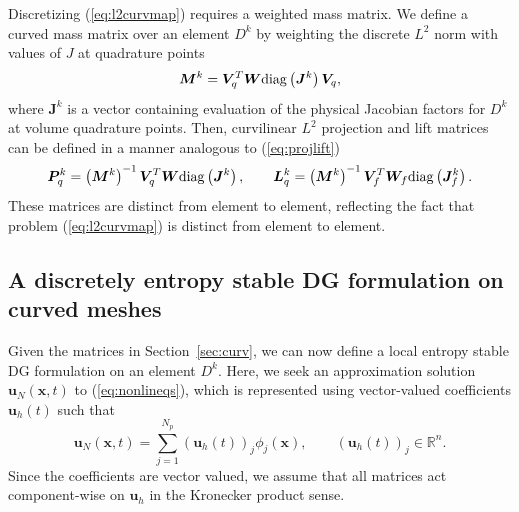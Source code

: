 \documentclass[preprint,10pt]{article}
\theoremstyle{definition}
\theoremstyle{lemma}
\theoremstyle{theorem}
\theoremstyle{assumption}
\newcommand{\LRp}[1]{\left( #1 \right)}
\newcommand{\diag}[1]{{\rm diag}\LRp{#1}}
\begin{document}
{Discretizing (\ref{eq:l2curvmap}) requires a weighted mass matrix.  We define a curved mass matrix over an element $D^k$ by weighting the discrete $L^2$ norm with values of $J$ at quadrature points
\begin{equation}
\bm{M}^k = \bm{V}_q^T \bm{W}\diag{\bm{J}^k}\bm{V}_q,
\label{eq:curvedmass}
\end{equation}
where $\bm{J}^k$ is a vector containing evaluation of the physical Jacobian factors for $D^k$ at volume quadrature points.
Then, curvilinear $L^2$ projection and lift matrices can be defined in a manner analogous to (\ref{eq:projlift})
\begin{equation}
\bm{P}^k_q = \LRp{\bm{M}^k}^{-1}\bm{V}_q^T\bm{W}\diag{\bm{J}^k}, \qquad \bm{L}^k_q = \LRp{\bm{M}^k}^{-1}\bm{V}_f^T\bm{W}_f\diag{\bm{J}^k_f}.
\label{eq:projliftcurved}
\end{equation}
These matrices are distinct from element to element, reflecting the fact that problem (\ref{eq:l2curvmap}) is distinct from element to element.  

\subsection{A discretely entropy stable DG formulation on curved meshes}

Given the matrices in Section~\ref{sec:curv}, we can now define a local entropy stable DG formulation on an element $D^k$.  Here, we seek an approximation solution $\bm{u}_N(\bm{x},t)$ to (\ref{eq:nonlineqs}), which is represented using vector-valued coefficients $\bm{u}_h(t)$ such that
\[
\bm{u}_N(\bm{x},t) = \sum_{j=1}^{N_p} \LRp{\bm{u}_h(t)}_j \phi_j(\bm{x}), \qquad \LRp{\bm{u}_h(t)}_j \in \mathbb{R}^n.
\]
Since the coefficients are vector valued, we assume that all matrices act component-wise on $\bm{u}_h$ in the Kronecker product sense.  

}
\end{document}
